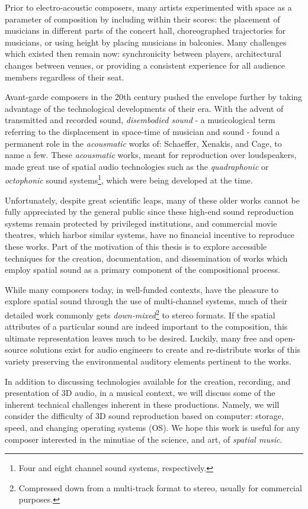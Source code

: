 Prior to electro-acoustic composers, many artists experimented with space as a parameter of composition by including within their scores: the placement of musicians in different parts of the concert hall, choreographed trajectories for musicians, or using height by placing musicians in balconies. Many challenges which existed then remain now: synchronicity between players, architectural changes between venues, or providing a consistent experience for all audience members regardless of their seat.

Avant-garde composers in the 20th century pushed the envelope further by taking advantage of the technological developments of their era. With the advent of transmitted and recorded sound, \textit{disembodied sound} - a musicological term referring to the displacement in space-time of musician and sound - found a permanent role in the \textit{acousmatic} works of: Schaeffer, Xenakis, and Cage, to name a few. These \textit{acousmatic} works, meant for reproduction over loudspeakers, made great use of spatial audio technologies such as the \textit{quadraphonic} or \textit{octophonic} sound systems\footnote{Four and eight channel sound systems, respectively.}, which were being developed at the time.

Unfortunately, despite great scientific leaps, many of these older works cannot be fully appreciated by the general public since these high-end sound reproduction systems remain protected by privileged institutions, and commercial movie theatres, which harbor similar systems, have no financial incentive to reproduce these works. Part of the motivation of this thesis is to explore accessible techniques for the creation, documentation, and dissemination of works which employ spatial sound as a primary component of the compositional process. 

While many composers today, in well-funded contexts, have the pleasure to explore spatial sound through the use of multi-channel systems, much of their detailed work commonly gets \textit{down-mixed}\footnote{Compressed down from a multi-track format to stereo, usually for commercial purposes.} to stereo formats. If the spatial attributes of a particular sound are indeed important to the composition, this ultimate representation leaves much to be desired. Luckily, many free and open-source solutions exist for audio engineers to create and re-distribute works of this variety preserving the environmental auditory elements pertinent to the works.

In addition to discussing technologies available for the creation, recording, and presentation of 3D audio, in a musical context, we will discuss some of the inherent technical challenges inherent in these productions. Namely, we will consider the difficulty of 3D sound reproduction based on computer: storage, speed, and changing operating systems (OS). We hope this work is useful for any composer interested in the minutiae of the science, and art, of \textit{spatial music}.

